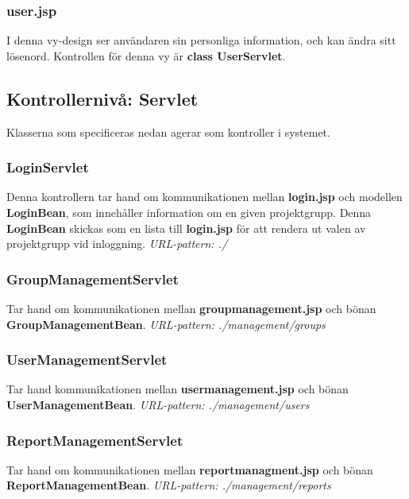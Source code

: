 \documentclass[paper=a4, fontsize=11pt,twoside]{article}
\begin{document}
\subsubsection{user.jsp}	
I denna vy-design ser användaren sin personliga information, och kan ändra sitt lösenord. Kontrollen för denna vy är \textbf{ class UserServlet}.

\subsection{Kontrollernivå: Servlet}
Klasserna som specificeras nedan agerar som kontroller i systemet.

\subsubsection{LoginServlet}
Denna kontrollern tar hand om kommunikationen mellan \textbf{login.jsp} och modellen \textbf{LoginBean}, som innehåller information om en given projektgrupp. Denna \textbf{LoginBean} skickas som en lista till \textbf{login.jsp} för att rendera ut valen av projektgrupp vid inloggning.\newline
\newline
\textit{URL-pattern: ./}

\subsubsection{GroupManagementServlet}
Tar hand om kommunikationen mellan \textbf{groupmanagement.jsp} och bönan \textbf{GroupManagementBean}.\newline
\newline
\textit{URL-pattern: ./management/groups}

\subsubsection{UserManagementServlet}
Tar hand kommunikationen mellan \textbf{usermanagement.jsp} och bönan \textbf{UserManagementBean}.\newline
\newline
\textit{URL-pattern: ./management/users}

\subsubsection{ReportManagementServlet}
Tar hand om kommunikationen mellan \textbf{reportmanagment.jsp} och bönan \textbf{ReportManagementBean}.\newline
\newline
\textit{URL-pattern: ./management/reports}
\end{document}
